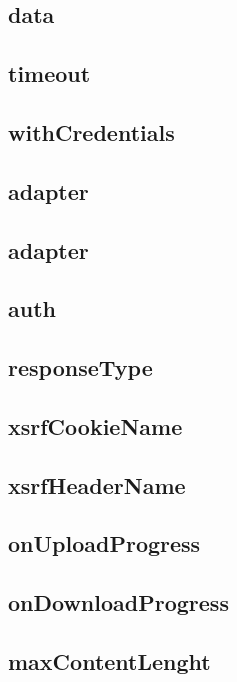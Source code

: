 \subsection{data}


\subsection{timeout}

\subsection{withCredentials}


\subsection{adapter}

\subsection{adapter}


\subsection{auth}


\subsection{responseType}


\subsection{xsrfCookieName}


\subsection{xsrfHeaderName}

\subsection{onUploadProgress}


\subsection{onDownloadProgress}

\subsection{maxContentLenght}


